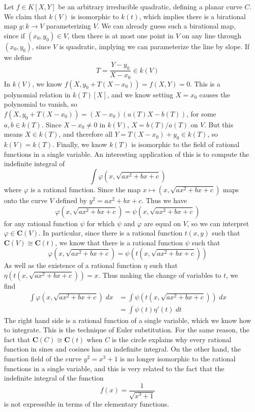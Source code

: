 \begin{example}
    Let $f \in K[X,Y]$ be an arbitrary irreducible quadratic, defining a planar curve $C$. We claim that $k(V)$ is isomorphic to $k(t)$, which implies there is a birational map $g: k \to V$ parameterizing $V$. We can already guess such a birational map, since if $(x_0,y_0) \in V$, then there is at most one point in $V$ on any line through $(x_0,y_0)$, since $V$ is quadratic, implying we can parameterize the line by slope. If we define
    \[ T = \frac{Y - y_0}{X - x_0} \in k(V) \]
    In $k(V)$, we know $f(X, y_0 + T(X - x_0)) = f(X,Y) = 0$. This is a polynomial relation in $k(T)[X]$, and we know setting $X = x_0$ causes the polynomial to vanish, so $f(X, y_0 + T(X - x_0)) = (X - x_0)(a(T)X - b(T))$, for some $a,b \in k(T)$. Since $X - x_0 \neq 0$ in $k(V)$, $X = b(T)/a(T)$ on $V$. But this means $X \in k(T)$, and therefore all $Y = T(X - x_0) + y_0 \in k(T)$, so $k(V) = k(T)$. Finally, we know $k(T)$ is isomorphic to the field of rational functions in a single variable. An interesting application of this is to compute the indefinite integral of
    \[ \int \varphi \left( x,\sqrt{ax^2 + bx + c} \right) \]
    where $\varphi$ is a rational function. Since the map $x \mapsto (x,\sqrt{ax^2 + bx + c})$ maps onto the curve $V$ defined by $y^2 = ax^2 + bx + c$. Thus we have
    \[ \varphi \left( x, \sqrt{ax^2 + bx + c} \right) = \psi \left( x, \sqrt{ax^2 + bx + c} \right)  \]
    for any rational function $\psi$ for which $\psi$ and $\varphi$ are equal on $V$, so we can interpret $\varphi \in \mathbf{C}(V)$. In particular, since there is a rational function $t(x,y)$ such that $\mathbf{C}(V) \cong \mathbf{C}(t)$, we know that there is a rational function $\psi$ such that
    \[ \varphi \left( x, \sqrt{ax^2 + bx + c} \right) = \psi \left( t \left( x, \sqrt{ax^2 + bx + c} \right) \right) \]
    As well as the existence of a rational function $\eta$ such that $\eta(t(x,\sqrt{ax^2 + bx + c})) = x$. Thus making the change of variables to $t$, we find
    \begin{align*}
        \int \varphi \left( x, \sqrt{ax^2 + bx + c} \right)\; dx &= \int \psi \left(t \left( x, \sqrt{ax^2 + bx + c} \right) \right)\; dx \\
        &= \int \psi(t) \eta'(t) \; dt
    \end{align*}
    The right hand side is a rational function of a single variable, which we know how to integrate. This is the technique of Euler substitution. For the same reason, the fact that $\mathbf{C}(C) \cong \mathbf{C}(t)$ when $C$ is the circle explains why every rational function in sines and cosines has an indefinite integral. On the other hand, the function field of the curve $y^2 = x^3 + 1$ is no longer isomorphic to the rational functions in a single variable, and this is very related to the fact that the indefinite integral of the function
    \[ f(x) = \frac{1}{\sqrt{x^3 + 1}} \]
    is not expressible in terms of the elementary functions.
\end{example}

